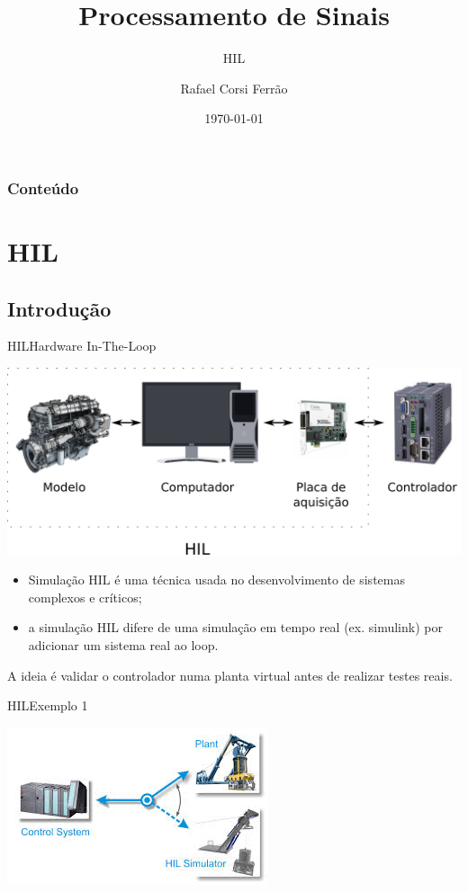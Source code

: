 \documentclass{beamer}
\title{Processamento de Sinais}
\subtitle{HIL}
\author{Rafael Corsi Ferrão}
\date{\today}
\institute{\url{rafael.corsi@maua.br}}
\begin{document}
\begin{frame}[plain,t]
	\titlepage
\end{frame}

\begin{frame}
	\frametitle{Conteúdo}
		\tableofcontents
\end{frame}

\section{HIL}

\subsection{Introdução}

\begin{frame}{HIL}{Hardware In-The-Loop}
	\begin{center}
	\includegraphics[width=0.9\linewidth]{hil}
	\end{center}
	
	\begin{itemize}
	\item Simulação HIL é uma técnica usada no desenvolvimento de sistemas complexos e críticos;
	\item a simulação HIL difere de uma simulação em tempo real (ex. simulink) por adicionar um sistema real ao loop.
	\end{itemize}
	
	A ideia é validar o controlador numa planta virtual antes de realizar testes reais.
\end{frame}

\begin{frame}{HIL}{Exemplo 1}
	\begin{center}
	\includegraphics[width=0.8\linewidth]{hil3}
	\end{center}	
\end{frame}
\end{document}
